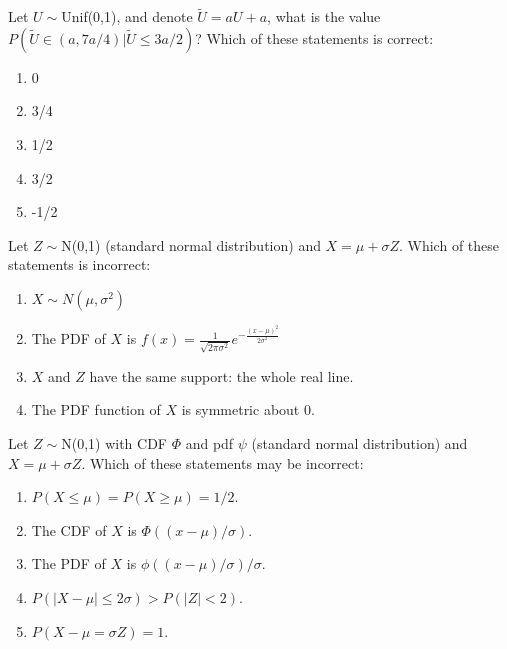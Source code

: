 \documentclass[poll_tutorial_format]{subfiles}
\begin{document}
	
	\begin{exercise}
	 	Let $U\sim $Unif(0,1), and denote $\tilde{U}=aU+a$, what is the value $P(\tilde{U}\in(a,7a/4)|\tilde{U}\leq 3a/2)$?  
		Which of these statements is correct: 
		\begin{enumerate}
			\item 0
			\item 3/4
			\item 1/2
			\item 3/2
			\item -1/2 
		\end{enumerate}
	\end{exercise}
	
	
	\begin{exercise}
		Let $Z\sim$N(0,1) (standard normal distribution) and $X=\mu+\sigma Z$. 
		Which of these statements is incorrect: 
		\begin{enumerate}
			\item $X\sim N(\mu, \sigma^2)$
			\item The PDF of $X$ is $f(x)=\frac{1}{\sqrt{2\pi \sigma^2}} e^{-\frac{(x-\mu)^2 }{2\sigma^2 }}$
			\item $X$ and $Z$ have the same support: the whole real line.   
			\item The PDF function of $X$ is symmetric about 0.
		\end{enumerate}
	\end{exercise}
	

	\begin{exercise}
		Let $Z\sim$N(0,1) with CDF $\Phi$ and pdf $\psi$ (standard normal distribution) and $X=\mu+\sigma Z$. 
		Which of these statements may be incorrect: 
		\begin{enumerate}
			\item $P(X\leq \mu)=P(X\geq \mu)=1/2$.
			\item The CDF of $X$ is $\Phi((x-\mu)/\sigma)$.
			\item The PDF of $X$ is $\phi((x-\mu)/\sigma)/\sigma$.
			\item $P(|X-\mu|\leq 2\sigma) >P(|Z|<2)$.
			\item $P(X-\mu=\sigma Z)=1$.
		\end{enumerate}
	\end{exercise}
	
 
	
	
	
	
\end{document}
